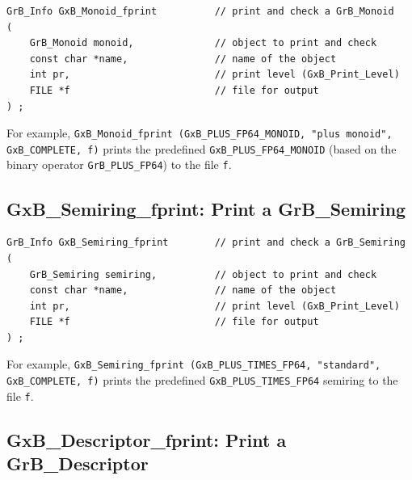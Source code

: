\begin{mdframed}[userdefinedwidth=6in]
{\footnotesize
\begin{verbatim}
GrB_Info GxB_Monoid_fprint          // print and check a GrB_Monoid
(
    GrB_Monoid monoid,              // object to print and check
    const char *name,               // name of the object
    int pr,                         // print level (GxB_Print_Level)
    FILE *f                         // file for output
) ;
\end{verbatim} } \end{mdframed}

For example,
\verb'GxB_Monoid_fprint (GxB_PLUS_FP64_MONOID, "plus monoid",'
\verb'GxB_COMPLETE, f)'
prints the predefined \verb'GxB_PLUS_FP64_MONOID' (based on the binary
operator \verb'GrB_PLUS_FP64') to the file \verb'f'.

\subsection{{\sf GxB\_Semiring\_fprint:} Print a {\sf GrB\_Semiring}}

\begin{mdframed}[userdefinedwidth=6in]
{\footnotesize
\begin{verbatim}
GrB_Info GxB_Semiring_fprint        // print and check a GrB_Semiring
(
    GrB_Semiring semiring,          // object to print and check
    const char *name,               // name of the object
    int pr,                         // print level (GxB_Print_Level)
    FILE *f                         // file for output
) ;
\end{verbatim} } \end{mdframed}

For example,
\verb'GxB_Semiring_fprint (GxB_PLUS_TIMES_FP64, "standard",'
\verb'GxB_COMPLETE, f)'
prints the predefined \verb'GxB_PLUS_TIMES_FP64' semiring to the file \verb'f'.

\newpage
\subsection{{\sf GxB\_Descriptor\_fprint:} Print a {\sf GrB\_Descriptor}}

